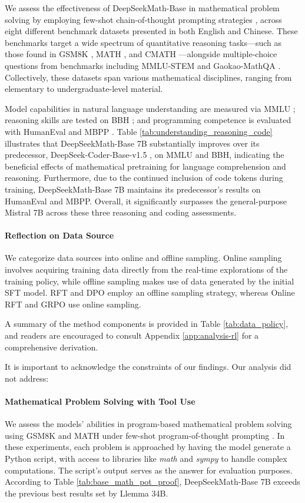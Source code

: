 \begin{itemize}[topsep=0pt]
We assess the effectiveness of DeepSeekMath-Base in mathematical problem solving by employing few-shot chain-of-thought prompting strategies \citep{cot}, across eight different benchmark datasets presented in both English and Chinese. These benchmarks target a wide spectrum of quantitative reasoning tasks—such as those found in GSM8K \citep{gsm8k}, MATH \citep{MATH}, and CMATH \citep{wei2023cmath}—alongside multiple-choice questions from benchmarks including MMLU-STEM \citep{mmlu} and Gaokao-MathQA \citep{agieval}. Collectively, these datasets span various mathematical disciplines, ranging from elementary to undergraduate-level material.

Model capabilities in natural language understanding are measured via MMLU \citep{mmlu}; reasoning skills are tested on BBH \citep{bbh}; and programming competence is evaluated with HumanEval \citep{codex} and MBPP \citep{mbpp}. Table \ref{tab:understanding_reasoning_code} illustrates that DeepSeekMath-Base 7B substantially improves over its predecessor, DeepSeek-Coder-Base-v1.5 \citep{deepseek-coder}, on MMLU and BBH, indicating the beneficial effects of mathematical pretraining for language comprehension and reasoning. Furthermore, due to the continued inclusion of code tokens during training, DeepSeekMath-Base 7B maintains its predecessor’s results on HumanEval and MBPP. Overall, it significantly surpasses the general-purpose Mistral 7B \citep{mistral} across these three reasoning and coding assessments.

\paragraph{Reflection on Data Source} We categorize data sources into online and offline sampling. Online sampling involves acquiring training data directly from the real-time explorations of the training policy, while offline sampling makes use of data generated by the initial SFT model. RFT and DPO employ an offline sampling strategy, whereas Online RFT and GRPO use online sampling.

A summary of the method components is provided in Table \ref{tab:data_policy}, and readers are encouraged to consult Appendix \ref{app:analysis-rl} for a comprehensive derivation.

It is important to acknowledge the constraints of our findings. Our analysis did not address:

\paragraph{Mathematical Problem Solving with Tool Use} We assess the models’ abilities in program-based mathematical problem solving using GSM8K and MATH under few-shot program-of-thought prompting \citep{pot,pal}. In these experiments, each problem is approached by having the model generate a Python script, with access to libraries like \textit{math} and \textit{sympy} to handle complex computations. The script’s output serves as the answer for evaluation purposes. According to Table \ref{tab:base_math_pot_proof}, DeepSeekMath-Base 7B exceeds the previous best results set by Llemma 34B.


\end{itemize}
